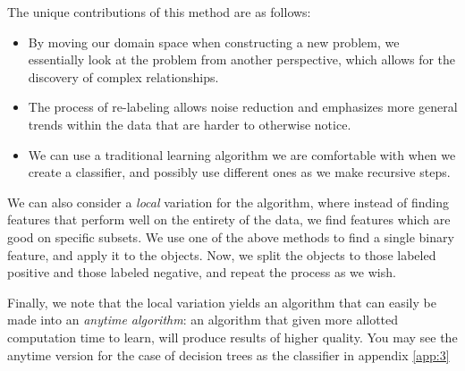 \documentclass[12pt, a4paper]{article}
\theoremstyle{definition}
\begin{document}
The unique contributions of this method are as follows:
\begin{itemize}
    \item By moving our domain space when constructing a new problem, we essentially look at the problem from another perspective, which allows for the discovery of complex relationships.
    \item The process of re-labeling allows noise reduction and emphasizes more general trends within the data that are harder to otherwise notice.
    \item We can use a traditional learning algorithm we are comfortable with when we create a classifier, and possibly use different ones as we make recursive steps.
\end{itemize}

We can also consider a \emph{local} variation for the algorithm, where instead of finding features that perform well on the entirety of the data, we find features which are good on specific subsets. We use one of the above methods to find a single binary feature, and apply it to the objects. Now, we split the objects to those labeled positive and those labeled negative, and repeat the process as we wish.

Finally, we note that the local variation yields an algorithm that can easily be made into an \emph{anytime algorithm}: an algorithm that given more allotted computation time to learn, will produce results of higher quality\citep{zilberstein1996using}. You may see the anytime version for the case of decision trees as the classifier in appendix \ref{app:3}


\end{document}
